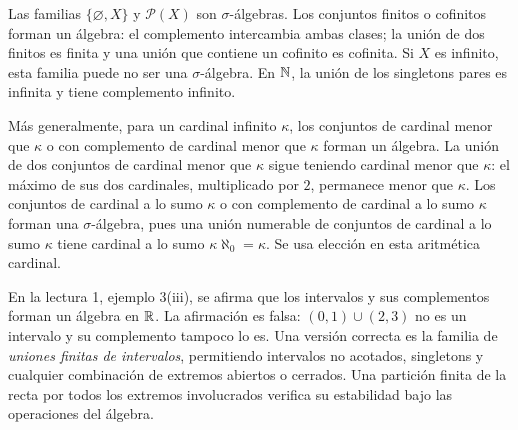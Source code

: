 \begin{ejemplo}
Las familias $\{\varnothing,X\}$ y $\mathcal P(X)$ son $\sigma$-álgebras. Los conjuntos finitos o cofinitos forman un álgebra: el complemento intercambia ambas clases; la unión de dos finitos es finita y una unión que contiene un cofinito es cofinita. Si $X$ es infinito, esta familia puede no ser una $\sigma$-álgebra. En $\mathbb N$, la unión de los singletons pares es infinita y tiene complemento infinito.

Más generalmente, para un cardinal infinito $\kappa$, los conjuntos de cardinal menor que $\kappa$ o con complemento de cardinal menor que $\kappa$ forman un álgebra. La unión de dos conjuntos de cardinal menor que $\kappa$ sigue teniendo cardinal menor que $\kappa$: el máximo de sus dos cardinales, multiplicado por $2$, permanece menor que $\kappa$. Los conjuntos de cardinal a lo sumo $\kappa$ o con complemento de cardinal a lo sumo $\kappa$ forman una $\sigma$-álgebra, pues una unión numerable de conjuntos de cardinal a lo sumo $\kappa$ tiene cardinal a lo sumo $\kappa\aleph_0=\kappa$. Se usa elección en esta aritmética cardinal.
\end{ejemplo}
\begin{observacion}
En la lectura 1, ejemplo 3(iii), se afirma que los intervalos y sus complementos forman un álgebra en $\mathbb R$. La afirmación es falsa: $(0,1)\cup(2,3)$ no es un intervalo y su complemento tampoco lo es. Una versión correcta es la familia de \emph{uniones finitas de intervalos}, permitiendo intervalos no acotados, singletons y cualquier combinación de extremos abiertos o cerrados. Una partición finita de la recta por todos los extremos involucrados verifica su estabilidad bajo las operaciones del álgebra.
\end{observacion}


